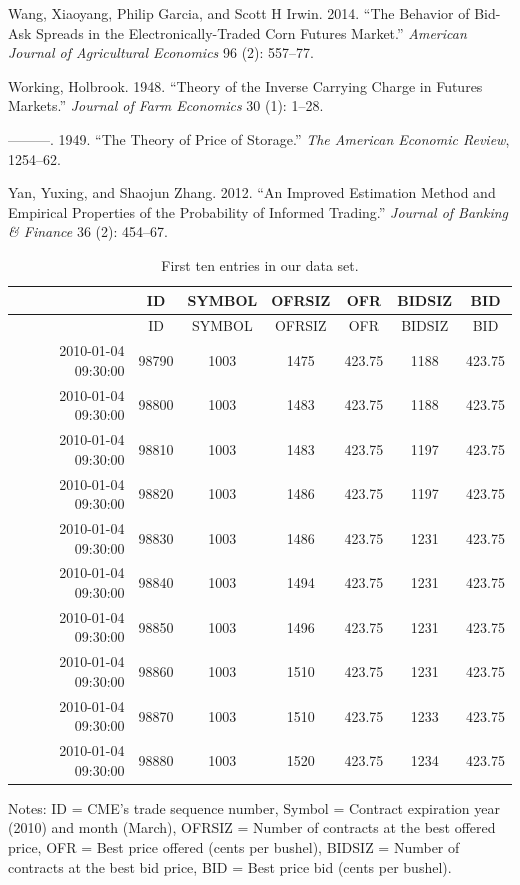\documentclass[review,12pt]{elsarticle}
\begin{document}
\begin{linenumbers}
Wang, Xiaoyang, Philip Garcia, and Scott H Irwin. 2014. ``The Behavior
of Bid-Ask Spreads in the Electronically-Traded Corn Futures Market.''
\emph{American Journal of Agricultural Economics} 96 (2): 557--77.

Working, Holbrook. 1948. ``Theory of the Inverse Carrying Charge in
Futures Markets.'' \emph{Journal of Farm Economics} 30 (1): 1--28.

---------. 1949. ``The Theory of Price of Storage.'' \emph{The American
Economic Review}, 1254--62.

Yan, Yuxing, and Shaojun Zhang. 2012. ``An Improved Estimation Method
and Empirical Properties of the Probability of Informed Trading.''
\emph{Journal of Banking \& Finance} 36 (2): 454--67.

\end{linenumbers}

\clearpage

\begin{longtable}[c]{@{}rcccccc@{}}
\caption{First ten entries in our data set.}\tabularnewline
\toprule
& ID & SYMBOL & OFRSIZ & OFR & BIDSIZ & BID\tabularnewline
\midrule
\endfirsthead
\toprule
& ID & SYMBOL & OFRSIZ & OFR & BIDSIZ & BID\tabularnewline
\midrule
\endhead
2010-01-04 09:30:00 & 98790 & 1003 & 1475 & 423.75 & 1188 &
423.75\tabularnewline
2010-01-04 09:30:00 & 98800 & 1003 & 1483 & 423.75 & 1188 &
423.75\tabularnewline
2010-01-04 09:30:00 & 98810 & 1003 & 1483 & 423.75 & 1197 &
423.75\tabularnewline
2010-01-04 09:30:00 & 98820 & 1003 & 1486 & 423.75 & 1197 &
423.75\tabularnewline
2010-01-04 09:30:00 & 98830 & 1003 & 1486 & 423.75 & 1231 &
423.75\tabularnewline
2010-01-04 09:30:00 & 98840 & 1003 & 1494 & 423.75 & 1231 &
423.75\tabularnewline
2010-01-04 09:30:00 & 98850 & 1003 & 1496 & 423.75 & 1231 &
423.75\tabularnewline
2010-01-04 09:30:00 & 98860 & 1003 & 1510 & 423.75 & 1231 &
423.75\tabularnewline
2010-01-04 09:30:00 & 98870 & 1003 & 1510 & 423.75 & 1233 &
423.75\tabularnewline
2010-01-04 09:30:00 & 98880 & 1003 & 1520 & 423.75 & 1234 &
423.75\tabularnewline
\bottomrule
\end{longtable}

Notes: ID = CME's trade sequence number, Symbol = Contract expiration
year (2010) and month (March), OFRSIZ = Number of contracts at the best
offered price, OFR = Best price offered (cents per bushel), BIDSIZ =
Number of contracts at the best bid price, BID = Best price bid (cents
per bushel).

\clearpage
\end{document}
